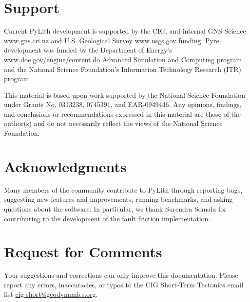 \section{Support}

Current PyLith development is supported by the CIG, and internal GNS
Science \url{www.gns.cri.nz} and U.S. Geological Survey \url{www.usgs.gov}
funding. Pyre development was funded by the Department of Energy's
\url{www.doe.gov/engine/content.do} Advanced Simulation and Computing
program and the National Science Foundation's Information Technology
Research (ITR) program.

This material is based upon work supported by the National Science
Foundation under Grants No. 0313238, 0745391, and EAR-0949446. Any
opinions, findings, and conclusions or recommendations expressed in
this material are those of the author(s) and do not necessarily reflect
the views of the National Science Foundation.


\section{Acknowledgments}

Many members of the community contribute to PyLith through reporting
bugs, suggesting new features and improvements, running benchmarks,
and asking questions about the software. In particular, we thank Surendra
Somala for contributing to the development of the fault friction implementation.


\section{Request for Comments}

Your suggestions and corrections can only improve this documentation.
Please report any errors, inaccuracies, or typos to the CIG Short-Term
Tectonics email list \url{cig-short@geodynamics.org}. 
